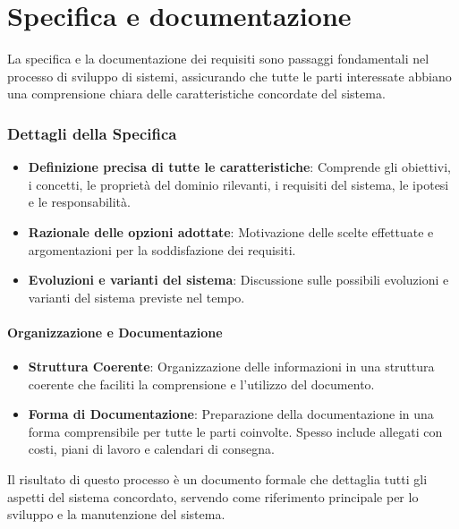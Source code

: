\chapter{Specifica e documentazione}
La specifica e la documentazione dei requisiti sono passaggi fondamentali nel
processo di sviluppo di sistemi, assicurando che tutte le parti interessate abbiano
una comprensione chiara delle caratteristiche concordate del sistema.

\subsection*{Dettagli della Specifica}
\begin{itemize}
    \item \textbf{Definizione precisa di tutte le caratteristiche}: Comprende gli
    obiettivi, i concetti, le proprietà del dominio rilevanti, i requisiti del
    sistema, le ipotesi e le responsabilità.
    \item \textbf{Razionale delle opzioni adottate}: Motivazione delle scelte 
    effettuate e argomentazioni per la soddisfazione dei requisiti.
    \item \textbf{Evoluzioni e varianti del sistema}: Discussione sulle possibili 
    evoluzioni e varianti del sistema previste nel tempo.
\end{itemize}

\subsubsection{Organizzazione e Documentazione}
\begin{itemize}
    \item \textbf{Struttura Coerente}: Organizzazione delle informazioni in
    una struttura coerente che faciliti la comprensione e l'utilizzo del documento.
    \item \textbf{Forma di Documentazione}: Preparazione della documentazione in una
    forma comprensibile per tutte le parti coinvolte. Spesso include allegati con costi,
    piani di lavoro e calendari di consegna.
\end{itemize}

\begin{tcolorbox}[colback=orange!5!white,colframe=orange!75!black,title=Documento dei Requisiti]
Il risultato di questo processo
è un documento formale che dettaglia tutti gli aspetti del sistema concordato, servendo
come riferimento principale per lo sviluppo e la manutenzione del sistema.
\end{tcolorbox}
